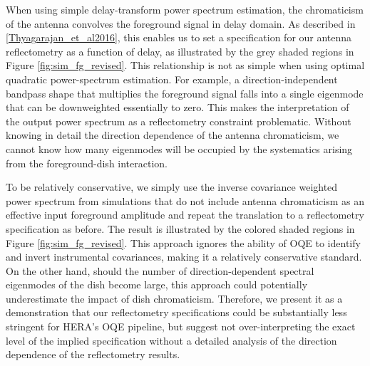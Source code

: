 \documentclass[twocolumn]{emulateapj}
\begin{document}
When using simple delay-transform power spectrum estimation, the chromaticism of the antenna convolves
the foreground signal in delay domain.  As described in \ref{Thyagarajan_et_al2016}, this 
enables us to set a specification
for our antenna reflectometry as a function of delay, as illustrated by the grey shaded regions in
Figure \ref{fig:sim_fg_revised}.  This relationship is not as simple when using
optimal quadratic power-spectrum estimation.  For example, a direction-independent bandpass shape 
that multiplies the foreground signal falls into a single eigenmode that can be downweighted essentially to zero.
This makes the interpretation of the output power spectrum as a reflectometry constraint problematic.  Without
knowing in detail the direction dependence of the antenna chromaticism, we cannot know how many eigenmodes
will be occupied by the systematics arising from the foreground-dish interaction. 

To be relatively conservative, we simply use the inverse covariance weighted power spectrum from simulations that
do not include antenna chromaticism as an effective input foreground amplitude and repeat the translation to
a reflectometry specification as before.  The result is illustrated by the colored shaded regions
in Figure \ref{fig:sim_fg_revised}.  This approach ignores the ability of OQE to identify and invert
instrumental covariances, making it a relatively conservative standard.  On the other hand, should the number
of direction-dependent spectral eigenmodes of the dish become large, this approach could potentially underestimate
the impact of dish chromaticism.  Therefore, we present it as a demonstration that our reflectometry specifications
could be substantially less stringent for HERA's OQE pipeline, but suggest not over-interpreting the exact 
level of the implied specification without a detailed analysis of the direction dependence of the reflectometry
results.
\end{document}
